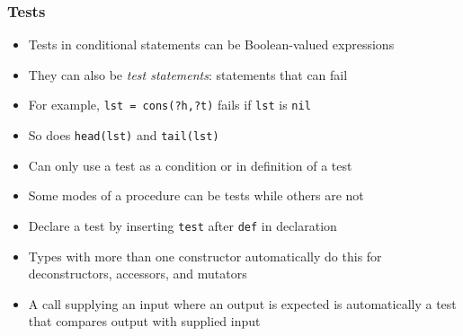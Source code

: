 \documentclass[12pt]{beamer}
\begin{document}
\begin{frame}[fragile]
\frametitle{Tests}
\begin{itemize}
\item Tests in conditional statements can be Boolean-valued expressions
\item They can also be \emph{test statements}: statements that can fail
\item For example, \texttt{lst = cons(?h,?t)} fails if \texttt{lst} is
  \texttt{nil}
\item So does \texttt{head(lst)} and \texttt{tail(lst)}
\item Can only use a test as a condition or in definition of a test
\item Some modes of a procedure can be tests while others are not
\item Declare a test by inserting \texttt{test} after \texttt{def} in
  declaration
\item Types with more than one constructor automatically do this for
  deconstructors, accessors, and mutators
\item A call supplying an input where an output is expected is
  automatically a test that compares output with supplied input
\end{itemize}
\end{frame}
\end{document}
